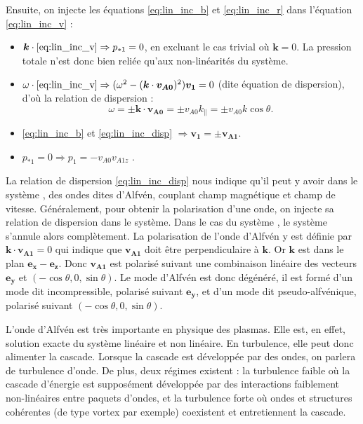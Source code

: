  Ensuite, on injecte les équations \eqref{eq:lin_inc_b} et \eqref{eq:lin_inc_r} dans l'équation \eqref{eq:lin_inc_v} : 
 \begin{itemize}
     \item $\boldsymbol{k} \cdot \eqref{eq:lin_inc_v} \Rightarrow  p_{*1} =0$, en excluant le cas trivial où $\boldsymbol{k}=0$. La pression totale n'est donc bien reliée qu'aux non-linéarités du système.
     \item $\omega \cdot \eqref{eq:lin_inc_v} \Rightarrow (\omega^2   - (\boldsymbol{k} \cdot \boldsymbol{v_{A0}})^2 ) \boldsymbol{v_{1}} = 0$ (dite équation de dispersion), d'où la relation de dispersion :  
     \begin{equation}
        \label{eq:lin_inc_disp} \omega = \pm \boldsymbol{k} \cdot \boldsymbol{v_{A0}} = \pm v_{A0} k_{\parallel} =  \pm v_{A0} k \cos \theta .
    \end{equation}
    \item \eqref{eq:lin_inc_b} et \eqref{eq:lin_inc_disp} $ \Rightarrow \boldsymbol{v_{1}} = \pm \boldsymbol{v_{A1}}$.
    \item $ p_{*1} =0 \Rightarrow p_{1} = - v_{A0} v_{A1z}$ .
\end{itemize}
La relation de dispersion \eqref{eq:lin_inc_disp} nous indique qu'il peut y avoir dans le système , des ondes dites d'Alfvén, couplant champ magnétique et champ de vitesse. 
Généralement, pour obtenir la polarisation d'une onde, on injecte sa relation de dispersion dans le système. Dans le cas du système , le système s'annule alors complètement. La polarisation de l'onde d'Alfvén y est définie par $\boldsymbol{k} \cdot \boldsymbol{v_{A1}}  = 0 $ qui indique que $\boldsymbol{v_{A1}} $ doit être perpendiculaire à $\boldsymbol{k}$. Or $\boldsymbol{k}$ est dans le plan $\boldsymbol{e_x}-\boldsymbol{e_z}$. Donc $\boldsymbol{v_{A1}} $ est polarisé suivant une combinaison linéaire des vecteurs $\boldsymbol{e_y}$ et $(-\cos \theta, 0, \sin \theta)$. Le mode d'Alfvén est donc dégénéré, il est formé d'un mode dit incompressible, polarisé suivant $\boldsymbol{e_y}$, et d'un mode dit pseudo-alfvénique, polarisé suivant $(-\cos \theta, 0, \sin \theta)$.

L'onde d'Alfvén est très importante en physique des plasmas. Elle est, en effet, solution exacte du système  linéaire et non linéaire. En turbulence, elle peut donc alimenter la cascade. Lorsque la cascade est développée par des ondes, on parlera de turbulence d'onde. De plus, deux régimes existent :  la turbulence faible où la cascade d'énergie est supposément développée par des interactions faiblement non-linéaires entre paquets d'ondes, et la turbulence forte où ondes et structures cohérentes (de type vortex par exemple) coexistent et entretiennent la cascade. 

